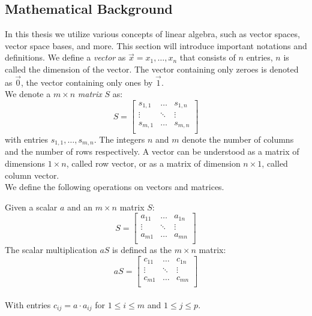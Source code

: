 \subsection{Mathematical Background}
In this thesis we utilize various concepts of linear algebra, such as vector spaces, vector space bases, and more. This section will introduce important notations and definitions.
We define a \textsl{vector} as $\vec{x} = x_1, \ldots, x_n$ that consists of $n$ entries, $n$ is called the dimension of the vector. The vector containing only zeroes is denoted as $\vec{0}$, the vector containing only ones by $\vec{1}$. \\ We denote a $m \times n$ \textsl{matrix} $S$ as:
\begin{equation*}
	S = \begin{bmatrix}
		s_{1 ,1} & \ldots & s_{1, n} \\
		\vdots & \ddots & \vdots \\
		s_{m ,1} & \ldots & s_{m, n} \\
	\end{bmatrix}
\end{equation*}
with entries $s_{1, 1}, \ldots, s_{m, n}$. The integers $n$ and $m$ denote the number of columns and the number of rows respectively. A vector can be understood as a matrix of dimensions $1 \times n$, called row vector, or as a matrix of dimension $n \times 1$, called column vector. \\
We define the following operations on vectors and matrices.
\begin{mydef}
	Given a scalar $a$ and an $m \times n$ matrix $S$:
	\begin{equation*}
		S = 
		\begin{bmatrix}
			a_{11} & \ldots & a_{1n} \\
			\vdots & \ddots & \vdots \\
			a_{m1} & \ldots & a_{mn} \\
		\end{bmatrix}
		\end{equation*} The scalar multiplication $aS$ is defined as the $m \times n$ matrix:
		\begin{equation*}
		aS =
		\begin{bmatrix}
			c_{11} & \ldots & c_{1n} \\
			\vdots & \ddots & \vdots \\
			c_{m1} & \ldots & c_{mn} \\
		\end{bmatrix}
	\end{equation*} 
\\
	With entries $c_{ij} =  a \cdot a_{ij}$ for $1 \leq i \leq m$ and $1 \leq j \leq p$.
\end{mydef}
